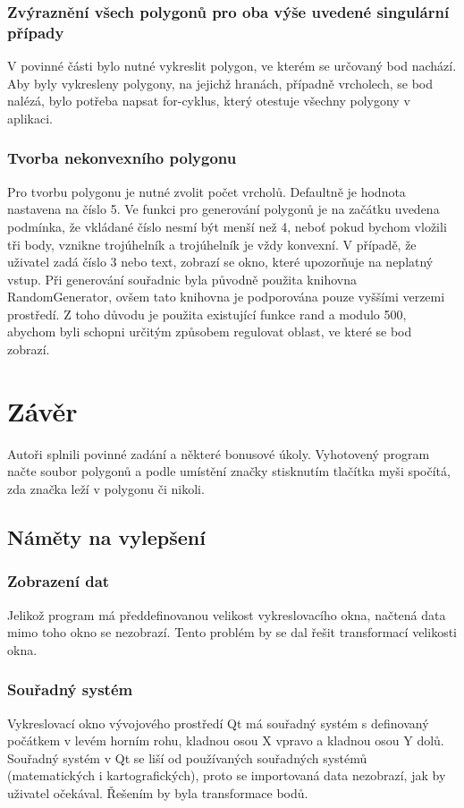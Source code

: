 \documentclass[a4paper, 12pt]{article}
\begin{document}
\subsubsection{Zvýraznění všech polygonů pro oba výše uvedené singulární případy}
V povinné části bylo nutné vykreslit polygon, ve kterém se určovaný bod nachází. Aby byly vykresleny polygony, na jejichž hranách, případně vrcholech, se bod nalézá, bylo potřeba napsat for-cyklus, který otestuje všechny polygony v aplikaci.


\subsubsection{Tvorba nekonvexního polygonu}
Pro tvorbu polygonu je nutné zvolit počet vrcholů. Defaultně je hodnota nastavena na číslo 5. Ve funkci pro generování polygonů je na začátku uvedena podmínka, že vkládané číslo nesmí být menší než 4, neboť pokud bychom vložili tři body, vznikne trojúhelník a trojúhelník je vždy konvexní. V případě, že uživatel zadá číslo 3 nebo text, zobrazí se okno, které upozorňuje na neplatný vstup. Při generování souřadnic byla původně použita knihovna RandomGenerator, ovšem tato knihovna je podporována pouze vyššími verzemi prostředí. Z toho důvodu je použita existující funkce rand a modulo 500, abychom byli schopni určitým způsobem regulovat oblast, ve které se bod zobrazí.

\clearpage
\section{Závěr}
Autoři splnili povinné zadání a některé bonusové úkoly. Vyhotovený program načte soubor polygonů a podle umístění značky stisknutím tlačítka myši spočítá, zda značka leží v polygonu či nikoli.

\subsection{Náměty na vylepšení}
\subsubsection{Zobrazení dat}
Jelikož program má předdefinovanou velikost vykreslovacího okna, načtená data mimo toho okno se nezobrazí. Tento problém by se dal řešit transformací velikosti okna.

\subsubsection{Souřadný systém}
Vykreslovací okno vývojového prostředí Qt má souřadný systém s definovaný počátkem v levém horním rohu,  kladnou osou X vpravo a kladnou osou Y dolů. Souřadný systém v Qt se liší od používaných souřadných systémů (matematických i kartografických), proto se importovaná data nezobrazí, jak by uživatel očekával. Řešením by byla transformace bodů.
\end{document}
